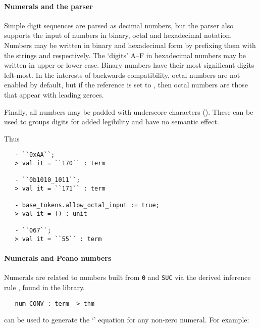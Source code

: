 \paragraph{Numerals and the parser}
%
%
Simple digit sequences are parsed as decimal numbers, but the parser
also supports the input of numbers in binary, octal and hexadecimal
notation.  Numbers may be written in binary and hexadecimal form by
prefixing them with the strings  and  respectively.  The
`digits' A--F in hexadecimal numbers may be written in upper or lower
case.  Binary numbers have their most significant digits left-most. In
the interests of backwards compatibility, octal numbers are not
enabled by default, but if the reference
 is set to , then octal
numbers are those that appear with leading zeroes.

Finally, all numbers may be padded with underscore characters
(\ml{\_}).  These can be used to groups digits for added legibility
and have no semantic effect.

Thus
\begin{session}
\begin{verbatim}
   - ``0xAA``;
   > val it = ``170`` : term

   - ``0b1010_1011``;
   > val it = ``171`` : term

   - base_tokens.allow_octal_input := true;
   > val it = () : unit

   - ``067``;
   > val it = ``55`` : term
\end{verbatim}
\end{session}

\paragraph{Numerals and Peano numbers}

Numerals are related to numbers built from {\small\verb+0+} and
{\small\verb+SUC+} via the derived inference rule
, found in the  library.

\begin{boxed}
\begin{verbatim}
   num_CONV : term -> thm
\end{verbatim}
\end{boxed}

\noindent {} can be used to generate the `'
equation for any non-zero numeral.  For example:

